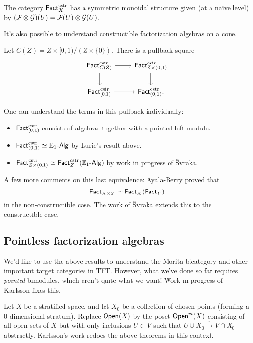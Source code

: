 \begin{thm}[KSW]
	The category $\mathsf{Fact}_X^{\mathrm{cstr}}$ has a symmetric monoidal structure given (at a na\"ive level) by $(\mathcal{F} \otimes \mathcal{G})(U) = \mathcal{F}(U) \otimes \mathcal{G}(U)$.
\end{thm}

It's also possible to understand constructible factorization algebras on a cone.

\begin{thm}
	Let $C(Z) = Z \times [0, 1) / (Z \times \{0\})$.
	There is a pullback square
	\[
		\begin{tikzcd}
			\Fact_{C(Z)}\cstr \rar \dar & \Fact_{Z \times (0,1)}\cstr \dar \\
			\Fact_{[0, 1)}\cstr \rar & \Fact_{(0,1)}\cstr.
		\end{tikzcd}
	\]
\end{thm}

One can understand the terms in this pullback individually:
\begin{itemize}
	\item $\mathsf{Fact}_{[0,1)}^{\mathrm{cstr}}$ consists of algebras together with a pointed left module.
	\item $\mathsf{Fact}_{(0,1)}^{\mathrm{cstr}} \simeq \mathbb{E}_1\textrm{-}\mathsf{Alg}$ by Lurie's result above.
	\item $\mathsf{Fact}_{Z \times (0,1)}^{\mathrm{cstr}} \simeq \mathsf{Fact}_Z^{\mathrm{cstr}}(\mathbb{E}_1\textrm{-}\mathsf{Alg})$ by work in progress of \v{S}vraka.
\end{itemize}
A few more comments on this last equivalence: Ayala-Berry proved that
\[
	\mathsf{Fact}_{X \times Y} \simeq \mathsf{Fact}_X(\mathsf{Fact}_Y)
\]
in the non-constructible case.
The work of \v{S}vraka extends this to the constructible case.

\subsection{Pointless factorization algebras}

We'd like to use the above results to understand the Morita bicategory and other important target categories in TFT.
However, what we've done so far requires \emph{pointed} bimodules, which aren't quite what we want!
Work in progress of Karlsson fixes this.

Let $X$ be a stratified space, and let $X_0$ be a collection of chosen points (forming a 0-dimensional stratum).
Replace $\mathsf{Open}(X)$ by the poset $\mathsf{Open}^m(X)$ consisting of all open sets of $X$ but with only inclusions $U \subset V$ such that $U \cup X_0 \xrightarrow{\sim} V \cap X_0$ abstractly.
Karlsson's work redoes the above theorems in this context.

